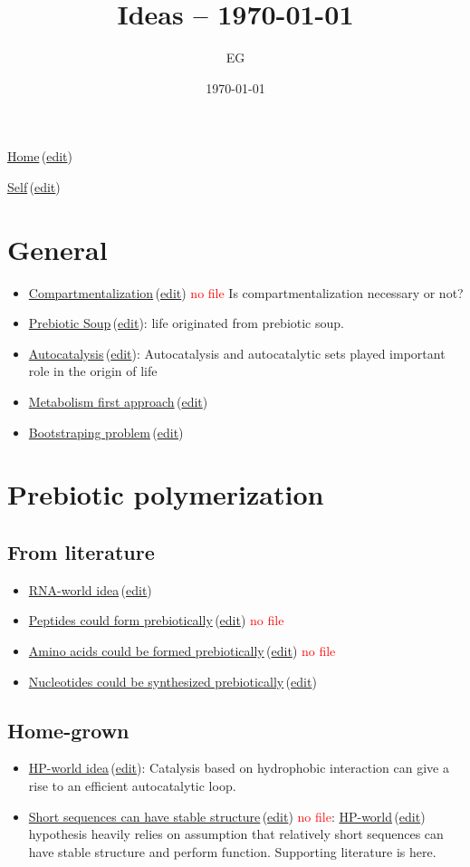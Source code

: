 \documentclass[12pt]{paper}
\title{Ideas -- \today}
\author{EG}
\date{\today}
\newcommand{\red}[1]{\textcolor{red}{#1}}
\newcommand{\wikilink}[2] { \href{#1.pdf}{#2}\,(\href{#1.tex}{edit})}
\begin{document}
 \maketitle
\wikilink{home}{Home}

\wikilink{ideas}{Self}
 
\tableofcontents


\section{General}
\begin{itemize}
 \item \wikilink{compartment}{Compartmentalization} \red{no file} Is compartmentalization 
necessary or not?
\item \wikilink{prebiotic\_soup}{Prebiotic Soup}: life originated from prebiotic soup.
\item \wikilink{autocatalysis}{Autocatalysis}: Autocatalysis and autocatalytic sets played 
important role in the origin of life
\item \wikilink{metabolism}{Metabolism first approach}
\item \wikilink{bootstraping_problem}{Bootstraping problem}
\end{itemize}


\section{Prebiotic polymerization}
\subsection{From literature}
\begin{itemize}
\item \wikilink{rna\_world}{RNA-world idea}
 \item  \wikilink{peptide\_world}{Peptides could form prebiotically} \red{no file}
 \item \wikilink{prebiotic\_aa}{Amino acids could be formed prebiotically} \red{no file}
 \item \wikilink{prebiotic\_nucleotides}{Nucleotides could be synthesized prebiotically}
\end{itemize}

\subsection{Home-grown}
\begin{itemize}
 \item \wikilink{hp\_world\_thesis}{HP-world idea}: Catalysis based on hydrophobic interaction can 
give a rise to an efficient 
autocatalytic loop.
\item \wikilink{short\_able\_sequences}{Short sequences can have stable structure} \red{no file}: 
\wikilink{hp\_world\_thesis}{HP-world}  hypothesis heavily relies on 
assumption that relatively short sequences can have stable structure and perform function. 
Supporting literature is here. 

\end{itemize}
\end{document}
